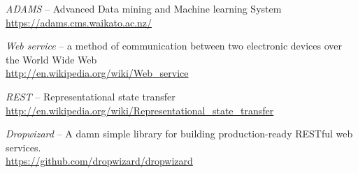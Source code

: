 
\begin{thebibliography}{999}

		\textit{ADAMS} -- Advanced Data mining and Machine learning System \\
		{\scriptsize \url{https://adams.cms.waikato.ac.nz/}{}}
		
		\textit{Web service} -- a method of communication between two electronic 
		devices over the World Wide Web \\
		{\scriptsize \url{http://en.wikipedia.org/wiki/Web_service}{}}
		
		\textit{REST} -- Representational state transfer \\
		{\scriptsize \url{http://en.wikipedia.org/wiki/Representational_state_transfer}{}}

		\textit{Dropwizard} -- A damn simple library for building production-ready RESTful web services. \\
		\url{https://github.com/dropwizard/dropwizard}{}

\end{thebibliography}
